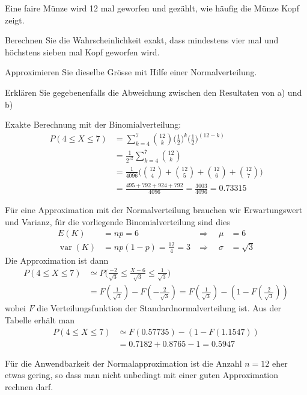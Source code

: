 Eine faire Münze wird 12 mal geworfen und gezählt, wie häufig die
Münze Kopf zeigt.
\begin{teilaufgaben}
\item Berechnen Sie die Wahrscheinlichkeit exakt, dass mindestens vier mal
und höchstens sieben mal Kopf geworfen wird.
\item Approximieren Sie dieselbe Grösse mit Hilfe einer Normalverteilung.
\item Erklären Sie gegebenenfalls die Abweichung zwischen den Resultaten
von a) und b)
\end{teilaufgaben}

\begin{loesung}
\begin{teilaufgaben}
\item Exakte Berechnung mit der Binomialverteilung:
\begin{align*}
P(4\le X\le 7)&=\sum_{k=4}^7\binom{12}{k}
\biggl(\frac12\biggr)^k
\biggl(\frac12\biggr)^{(12-k)}
\\
&=\frac1{2^{12}}\sum_{k=4}^{7}\binom{12}{k}
\\
&=\frac1{4096}\biggl(
\binom{12}{4}+
\binom{12}{5}+
\binom{12}{6}+
\binom{12}{7}
\biggr)
\\
&=\frac{495+792+924+792}{4096}
=
\frac{3003}{4096}=0.73315
\end{align*}
\item
Für eine Approximation mit der Normalverteilung brauchen wir Erwartungswert
und Varianz, für die vorliegende Binomialverteilung sind dies
\begin{align*}
E(K) &=np=6
&\Rightarrow\quad\mu&=6
\\
\operatorname{var}(K)&=np(1-p)=\frac{12}{4}=3
&\Rightarrow\quad\sigma&=\sqrt{3}
\end{align*}
Die Approximation ist dann
\begin{align*}
P(4\le X\le 7)
&\simeq
P\biggl(
\frac{-2}{\sqrt{3}}\le \frac{X-6}{\sqrt{3}}\le \frac1{\sqrt{3}}
\biggr)
\\
&=F(\frac1{\sqrt{3}})-F(-\frac2{\sqrt{3}})
=F(\frac1{\sqrt{3}})-(1-F(\frac2{\sqrt{3}}))
\end{align*}
wobei $F$ die Verteilungsfunktion der Standardnormalverteilung ist. Aus
der Tabelle erhält man
\begin{align*}
P(4\le X\le 7)
&\simeq
F(0.57735) - (1-F(1.1547))
\\
&=0.7182 + 0.8765 - 1=0.5947
\end{align*}
\item
Für die Anwendbarkeit der Normalapproximation ist die Anzahl $n=12$
eher etwas gering, so dass man nicht unbedingt mit einer guten Approximation
rechnen darf.


\end{teilaufgaben}
\end{loesung}
